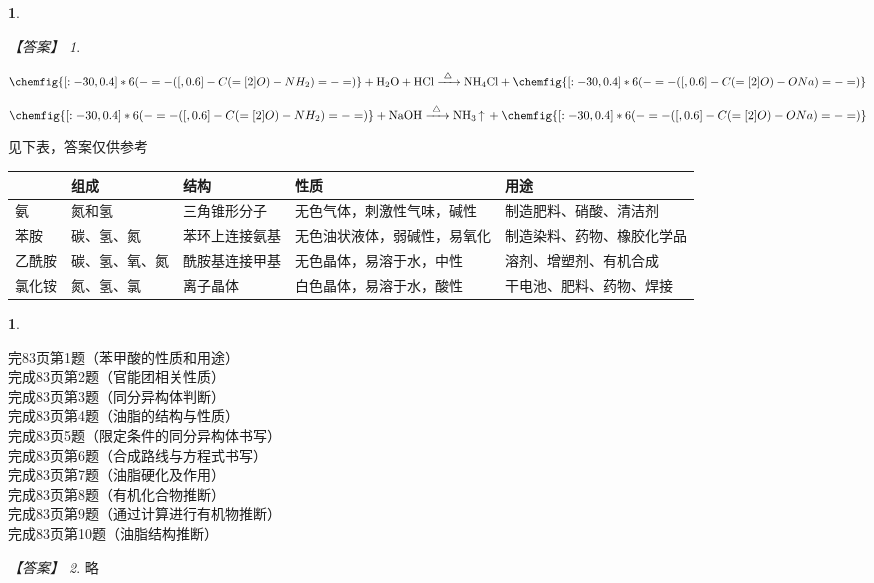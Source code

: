 \documentclass[UTF8, 10pt, a4paper, oneside]{ctexart}
\newcommand{\fs}[1]{{\fangsong #1}}%
\theoremstyle{definition}
\newtheorem{exercise}{}
\newtheorem{subexercise}{}[exercise]%
\theoremstyle{remark}
\newtheorem*{answer}{【答案】}
\theoremstyle{plain}
\begin{document}
\begin{subexercise}
\begin{answer}
\begin{inparaenum}
            \item $\chemfig{[:-30,0.4] *6(-=-([,0.6]-C(=[2]O)-NH_2)=-=)}\ce{+ H2O + HCl ->T[$\triangle$] NH4Cl + }\chemfig{[:-30,0.4] *6(-=-([,0.6]-C(=[2]O)-ONa)=-=)}$
            \item $\chemfig{[:-30,0.4] *6(-=-([,0.6]-C(=[2]O)-NH_2)=-=)}\ce{+ NaOH ->T[$\triangle$] NH3 ^ + }\chemfig{[:-30,0.4] *6(-=-([,0.6]-C(=[2]O)-ONa)=-=)}$
            \item 见下表，答案仅供参考
            \begin{table}[!ht]
                \centering
                \begin{tabular}{|l|l|l|l|l|}
                    \hline
                    ~   & 组成      & 结构      & 性质             & 用途            \\ \hline
                    氨   & 氮和氢     & 三角锥形分子  & 无色气体，刺激性气味，碱性  & 制造肥料、硝酸、清洁剂   \\ \hline
                    苯胺  & 碳、氢、氮   & 苯环上连接氨基 & 无色油状液体，弱碱性，易氧化 & 制造染料、药物、橡胶化学品 \\ \hline
                    乙酰胺 & 碳、氢、氧、氮 & 酰胺基连接甲基 & 无色晶体，易溶于水，中性   & 溶剂、增塑剂、有机合成   \\ \hline
                    氯化铵 & 氮、氢、氯   & 离子晶体    & 白色晶体，易溶于水，酸性   & 干电池、肥料、药物、焊接  \\ \hline
                \end{tabular}
            \end{table}
        \end{inparaenum}
    \end{answer}
\end{subexercise}\setcounter{exercise}{23}
\begin{exercise}
    \begin{multicols}{2}
        \noindent 完83页第1题（苯甲酸的性质和用途）\\
        完成83页第2题（官能团相关性质）\\
        完成83页第3题（同分异构体判断）\\
        完成83页第4题（油脂的结构与性质）\\
        完成83页5题（限定条件的同分异构体书写）\\
        完成83页第6题（合成路线与方程式书写）\\
        完成83页第7题（油脂硬化及作用）\\
        完成83页第8题（有机化合物推断）\\
        完成83页第9题（通过计算进行有机物推断）\\
        完成83页第10题（油脂结构推断）\\
    \end{multicols}
    \begin{answer}
        \fs{略}
    \end{answer}
\end{exercise}
\end{document}
